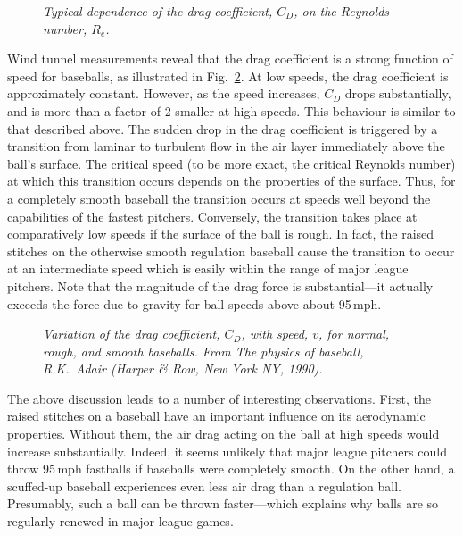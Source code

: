 \begin{figure}
\epsfysize=3in
\centerline{}
\caption{\em Typical dependence of the drag coefficient, $C_D$, on the Reynolds number, $R_e$.}\label{fcd}
\end{figure}

 Wind tunnel measurements reveal that the drag coefficient is a strong
function of speed for baseballs, as illustrated in Fig.~\ref{fbaseball}.
At low speeds, the drag coefficient is approximately constant. However, as
the speed increases, $C_D$ drops substantially, and is more than a factor of
2 smaller at high speeds. This behaviour is similar to that described above.
The sudden drop in the drag coefficient is triggered by a transition from laminar
to turbulent flow in the air layer immediately above the ball's surface.
The critical speed (to be more exact, the critical
Reynolds number) at which this transition occurs depends on the properties of
the surface. Thus, for a completely smooth baseball the transition occurs at
speeds well beyond the capabilities of the fastest pitchers. Conversely,
the transition takes place at comparatively low speeds if the surface
of the ball is rough. In fact, the raised stitches on the otherwise smooth regulation baseball
cause the transition to occur at an intermediate speed which is
 easily  within the range
of major league pitchers. Note that the magnitude of the drag force is substantial---it
actually exceeds the force due to gravity for ball speeds above about 95\,mph.

\begin{figure}
\epsfysize=2.75in
\centerline{}
\caption{\em Variation of the drag coefficient, $C_D$, with speed, $v$, for
normal, rough, and smooth baseballs. From 
{\em The physics of baseball}, R.K.~Adair (Harper \& Row, New York NY, 1990). }\label{fbaseball}
\end{figure}

The above discussion leads to a number of interesting observations. First, the raised stitches
on a baseball have an important influence on its aerodynamic properties. Without
them, the air drag acting on the ball at high speeds would increase substantially. Indeed, it
seems unlikely that major league pitchers could throw 95\,mph fastballs if baseballs
were completely smooth. On the other hand, a scuffed-up baseball experiences even less
air drag than a regulation ball. Presumably, such a ball can be thrown faster---which explains why
balls are so  regularly renewed  in major league games.

